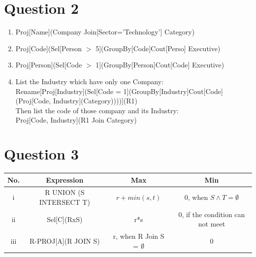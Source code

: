 \documentclass[11pt, a4paper]{article}
\begin{document}
\section*{Question 2}
\renewcommand{\labelenumi}{\roman{enumi}. }
\begin{enumerate}
    \item
    Proj[Name](Company Join[Sector='Technology'] Category)
    \item
    Proj[Code](Sel[Person $>$ 5](GroupBy[Code]Cout[Perso] Executive)
    \item 
    Proj[Person](Sel[Code $>$ 1](GroupBy[Person]Cout[Code] Executive)
    \item 
    List the Industry which have only one Company:\\
    Rename[Proj[Industry](Sel[Code = 1](GroupBy[Industry]Cout[Code] (Proj[Code, Industry](Category))))](R1)\\
    Then list the code of those company and its Industry:\\
    Proj[Code, Industry](R1 Join Category)
\end{enumerate}


\section*{Question 3}
    \begin{tabular}{ | c | c | c | c |}
        \hline
        No. & Expression & Max & Min\\
        \hline
        i & R UNION (S INTERSECT T) & $r+min(s,t)$ & 0, when $S \land T = \emptyset $\\
        \hline
        ii & Sel[C](RxS) & r*s & 0, if the condition can not meet \\
        \hline
        iii &R-PROJ[A](R JOIN S) & r, when R Join S = $\emptyset$ & 0\\
        \hline
    \end{tabular}
\end{document}
